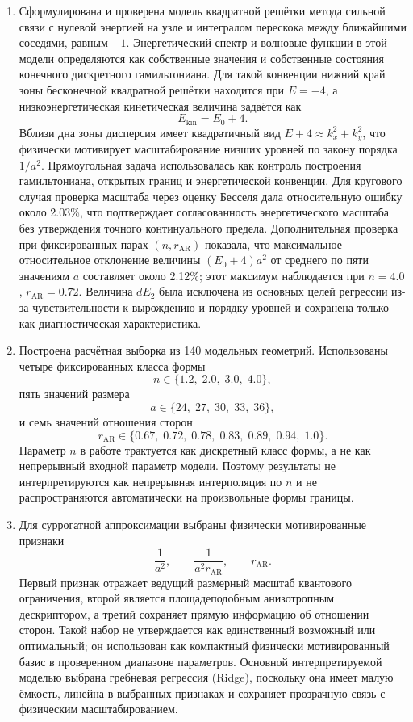 \begin{enumerate}
  \item Сформулирована и проверена модель квадратной решётки метода сильной связи с
  нулевой энергией на узле и интегралом перескока между ближайшими соседями, равным $-1$.
  Энергетический спектр и волновые функции в этой модели определяются как собственные
  значения и собственные состояния конечного дискретного гамильтониана. Для такой
  конвенции нижний край зоны бесконечной квадратной решётки находится при $E=-4$, а
  низкоэнергетическая кинетическая величина задаётся как
  \[
    E_{\mathrm{kin}} = E_0 + 4 .
  \]
  Вблизи дна зоны дисперсия имеет квадратичный вид $E+4 \approx k_x^2+k_y^2$, что
физически мотивирует масштабирование низших уровней по закону порядка $1/a^2$.
Прямоугольная задача использовалась как контроль построения гамильтониана, открытых границ
и энергетической конвенции. Для кругового случая проверка масштаба через оценку Бесселя
дала относительную ошибку около 2.03\%, что подтверждает согласованность энергетического
масштаба без утверждения точного континуального предела. Дополнительная проверка при
фиксированных парах $(n,r_{\mathrm{AR}})$ показала, что максимальное относительное
отклонение величины $(E_0+4)a^2$ от среднего по пяти значениям $a$ составляет около
2.12\%; этот максимум наблюдается при $n=4.0$, $r_{\mathrm{AR}}=0.72$. Величина $dE_2$
была исключена из основных целей регрессии из-за чувствительности к вырождению и порядку
уровней и сохранена только как диагностическая характеристика.

  \item Построена расчётная выборка из 140 модельных геометрий. Использованы четыре
  фиксированных класса формы
  \[
    n \in \{1.2,\;2.0,\;3.0,\;4.0\},
  \]
  пять значений размера
  \[
    a \in \{24,\;27,\;30,\;33,\;36\},
  \]
  и семь значений отношения сторон
  \[
    r_{\mathrm{AR}} \in \{0.67,\;0.72,\;0.78,\;0.83,\;0.89,\;0.94,\;1.0\}.
  \]
  Параметр $n$ в работе трактуется как дискретный класс формы, а не как непрерывный
входной параметр модели. Поэтому результаты не интерпретируются как непрерывная
интерполяция по $n$ и не распространяются автоматически на произвольные формы границы.

  \item Для суррогатной аппроксимации выбраны физически мотивированные признаки
  \[
    \frac{1}{a^2}, \qquad
    \frac{1}{a^2 r_{\mathrm{AR}}}, \qquad
    r_{\mathrm{AR}} .
  \]
  Первый признак отражает ведущий размерный масштаб квантового ограничения, второй
является площадеподобным анизотропным дескриптором, а третий сохраняет прямую информацию
об отношении сторон. Такой набор не утверждается как единственный возможный или
оптимальный; он использован как компактный физически мотивированный базис в проверенном
диапазоне параметров. Основной интерпретируемой моделью выбрана гребневая регрессия
(Ridge), поскольку она имеет малую ёмкость, линейна в выбранных признаках и сохраняет
прозрачную связь с физическим масштабированием.


\end{enumerate}
